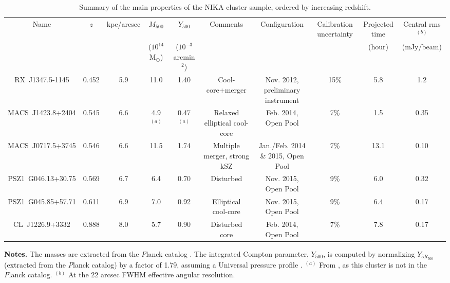 \documentclass[twocolumn,traditabstract]{aa}
\begin{document}
\begin{table}[]
\caption{\footnotesize{Summary of the main properties of the NIKA cluster sample, ordered by increasing redshift.}}
\begin{center}
\resizebox{\textwidth}{!} {
\begin{tabular}{c|c|c|c|c|c||c|c|c|c}
\hline
\hline
Name & $z$ & kpc/arcsec & $M_{500}$ & $Y_{500}$ & Comments & Configuration & Calibration uncertainty & Projected time & Central rms$^{(b)}$ \\
 &  & & ($10^{14}$ M$_{\odot}$)& ($10^{-3}$arcmin$^2$) & & & & (hour) & (mJy/beam) \\
\hline
RX~J1347.5-1145 & 0.452 & 5.9 & 11.0 & 1.40 & Cool-core+merger & Nov. 2012, preliminary instrument & 15\% & 5.8 & 1.2 \\ 
MACS~J1423.8+2404 & 0.545 & 6.6 & 4.9 $^{(a)}$ & 0.47 $^{(a)}$ & Relaxed elliptical cool-core & Feb. 2014, Open Pool & 7\% &1.5 & 0.35 \\ 
MACS~J0717.5+3745 & 0.546 & 6.6 & 11.5 & 1.74 & Multiple merger, strong kSZ & Jan./Feb. 2014 \& 2015, Open Pool & 7\% & 13.1 & 0.10 \\ 
PSZ1~G046.13+30.75 & 0.569 & 6.7 & 6.4 & 0.70 & Disturbed & Nov. 2015, Open Pool & 9\% & 6.0 &  0.32\\ 
PSZ1~G045.85+57.71 & 0.611 & 6.9 & 7.0 & 0.92 & Elliptical cool-core & Nov. 2015, Open Pool & 9\% & 6.4 & 0.17 \\ 
CL~J1226.9+3332 &  0.888 & 8.0 & 5.7 & 0.90 & Disturbed core & Feb. 2014, Open Pool & 7\% & 7.8 & 0.17 \\ 
\hline
\end{tabular}
}
\end{center}
{\small {\bf Notes.} The masses are extracted from the {\textit Planck} catalog \citep{PlanckXXVII2015}. The integrated Compton parameter, $Y_{500}$, is computed by normalizing $Y_{5R_{500}}$ (extracted from the {\textit Planck} catalog) by a factor of 1.79, assuming a Universal pressure profile \citep{Arnaud2010}. $^{(a)}$ From \cite{Adam2016a}, as this cluster is not in the {\textit Planck} catalog. $^{(b)}$ At the 22 arcsec FWHM effective angular resolution.}
\label{tab:cluster_summary}
\end{table}
\end{document}
